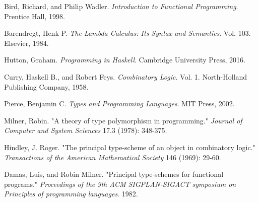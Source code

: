 \documentclass{article}
\begin{document}
  \begingroup
  \renewcommand{\addcontentsline}[3]{}
  \renewcommand{\section}[2]{}
  \begin{thebibliography}{9}

  Bird, Richard, and Philip Wadler.
  \textit{Introduction to Functional Programming}.
  Prentice Hall, 1998.

  Barendregt, Henk P.
  \textit{The Lambda Calculus: Its Syntax and Semantics}.
  Vol. 103. Elsevier, 1984.

  Hutton, Graham.
  \textit{Programming in Haskell}.
  Cambridge University Press, 2016.

  Curry, Haskell B., and Robert Feys.
  \textit{Combinatory Logic}.
  Vol. 1. North-Holland Publishing Company, 1958.

  Pierce, Benjamin C.
  \textit{Types and Programming Languages}.
  MIT Press, 2002.

  Milner, Robin.
  "A theory of type polymorphism in programming."
  \textit{Journal of Computer and System Sciences} 17.3 (1978): 348-375.

  Hindley, J. Roger.
  "The principal type-scheme of an object in combinatory logic."
  \textit{Transactions of the American Mathematical Society} 146 (1969): 29-60.

  Damas, Luis, and Robin Milner.
  "Principal type-schemes for functional programs."
  \textit{Proceedings of the 9th ACM SIGPLAN-SIGACT symposium on Principles of programming languages}. 1982.

  \end{thebibliography}
  \endgroup
\end{document}
